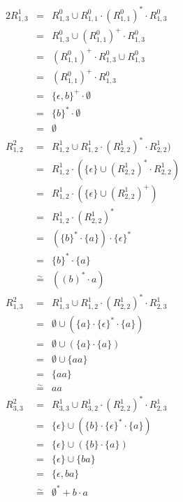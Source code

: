 \documentclass[10pt,a4paper,oneside,ngerman,numbers=noenddot]{scrartcl}
\begin{document}
\begin{alignat*}{2}
R_{1,3}^{1} &=& R_{1,3}^{0} \cup R_{1,1}^{0} \cdot (R_{1,1}^{0})^{*} \cdot R_{1,3}^{0} \\
&=& R_{1,3}^{0} \cup (R_{1,1}^{0})^{+} \cdot R_{1,3}^{0} \\
&=& (R_{1,1}^{0})^{+} \cdot R_{1,3}^{0} \cup R_{1,3}^{0}\\
&=& (R_{1,1}^{0})^{+} \cdot R_{1,3}^{0}\\
&=& \{\epsilon , b \}^{+} \cdot \emptyset \\
&=& \{b \}^{*} \cdot \emptyset \\
&=& \emptyset \\
%
R_{1,2}^{2} &=& R_{1,2}^{1} \cup R_{1,2}^{1} \cdot (R_{2,2}^{1})^{*} \cdot R_{2,2}^{1}) \\
&=& R_{1,2}^{1} \cdot (\{\epsilon \} \cup (R_{2,2}^{1})^{*} \cdot R_{2,2}^{1}) \\
&=& R_{1,2}^{1} \cdot (\{\epsilon \} \cup (R_{2,2}^{1})^{+}) \\
&=& R_{1,2}^{1} \cdot (R_{2,2}^{1})^{*} \\
&=& (\{b\}^{*} \cdot \{a\}) \cdot \{\epsilon \}^{*} \\
&=& \{b\}^{*} \cdot \{a\}\\
&\overset{\sim}{=}& ((b)^{*} \cdot a) \\
%
R_{1,3}^{2} &=& R_{1,3}^{1} \cup R_{1,2}^{1} \cdot (R_{2,2}^{1})^{*} \cdot R_{2,3}^{1} \\
&=& \emptyset \cup (\{a\} \cdot \{\epsilon \}^{*} \cdot \{a\}) \\
&=& \emptyset \cup (\{a\} \cdot \{a\}) \\
&=& \emptyset \cup \{aa\} \\
&=& \{aa\} \\
&\overset{\sim}{=}& aa \\
%
R_{3,3}^{2} &=& R_{3,3}^{1} \cup R_{3,2}^{1} \cdot (R_{2,2}^{1})^{*} \cdot R_{2,3}^{1} \\
&=& \{\epsilon \} \cup (\{b\} \cdot \{\epsilon \}^{*} \cdot \{a\}) \\
&=& \{\epsilon \} \cup (\{b\} \cdot \{a\}) \\
&=& \{\epsilon \} \cup \{ba\} \\
&=& \{\epsilon , ba\} \\
&\overset{\sim}{=}& \emptyset^{*} + b \cdot a
\end{alignat*}\\
\end{document}
